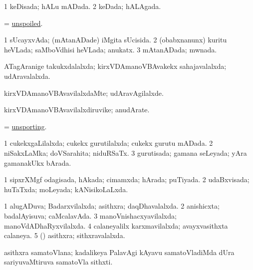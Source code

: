 \bentry
{} 
\gl{\gu}
\expl{}
\bmng
\bnum
\num{1} keDisada; hALu mADada. 
\num{2} keDada; hALAgada. 
\enum
\emng
\eentry

\bentry
{} 
\gl{\gu}
\expl{}
\bmng
= \hyperlink{unspoiled}{unspoiled}. 
\emng
\eentry

\bentry
{} 
\gl{\gu}
\expl{}
\bmng
\bnum
\num{1} sUcayxvAda; (mAtanADade) iMgita sUcisida. 
\num{2} (obabxnanunx) kuritu heVLada; saMboVdhisi heVLada; anukatx. 
\num{3} mAtanADada; mwnada. 
\enum
\emng
\eentry

\bentry
{} 
\gl{\gu}
\expl{}
\bmng
ATagAranige takukxdalalxda; kirxVDAmanoVBAvakekx sahajavalalxda; udAravalalxda. 
\emng
\eentry

\bentry
{} 
\gl{\kirxvi}
\expl{}
\bmng
kirxVDAmanoVBAvavilalxdaMte; udAravAgilalxde. 
\emng
\eentry

\bentry
{} 
\gl{\nA}
\expl{}
\bmng
kirxVDAmanoVBAvavilalxdiruvike; anudArate. 
\emng
\eentry

\bentry
{} 
\gl{\gu}
\expl{}
\bmng
= \hyperlink{unsporting}{unsporting}. 
\emng
\eentry

\bentry
{} 
\gl{\gu}
\expl{}
\bmng
\bnum
\num{1} cukekxgaLilalxda; cukekx gurutilalxda; cukekx gurutu mADada. 
\num{2} niSakxLaMka; doVSarahita; niduRSaTx. 
\num{3} gurutisada; gamana seLeyada; yAra gamanakUkx bArada. 
\enum
\emng
\eentry

\bentry
{} 
\gl{\gu}
\expl{}
\bmng
\bnum
\num{1} sipxrXMgf odagisada, hAkada; cimamxda; hArada; puTiyada. 
\num{2} udaBxvisada; huTaTxda; moLeyada; kANisikoLaLxda. 
\enum
\emng
\eentry

\bentry
{} 
\gl{\gu}
\bmng
\bnum
\num{1} alugADuva; Badarxvilalxda; asithxra; daqDhavalalxda. 
\num{2} anishicxta; badalAyisuva; caMcalavAda. 
\num{3} manoVnishacxyavilalxda; manoVdADhaRyxvilalxda. 
\num{4} calaneyalilx karxmavilalxda; avayxvasithxta calaneya. 
\num{5} (\ravi) asithxra; sithxravalalxda. 
\enum
\emng
\eentry

\bentry
{} 
\gl{\nA}
\expl{}
\bmng
asithxra samatoVlana; kadalikeya PalavAgi kAyavu samatoVladiMda dUra sariyuvaMtiruva samatoVla sithxti. 
\emng
\eentry

